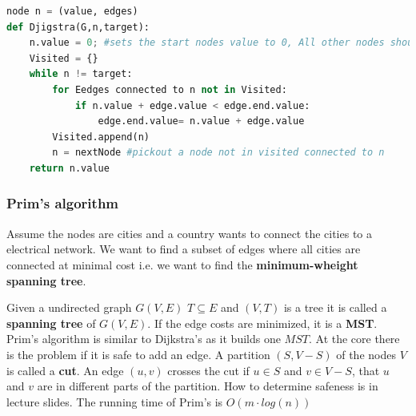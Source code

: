 \documentclass[12pt]{article} %
\begin{document}
\begin{lstlisting}[language=Python, caption=Dijkstra's in pseudo/Python]
node n = (value, edges)
def Djigstra(G,n,target):
    n.value = 0; #sets the start nodes value to 0, All other nodes should have inf as value. 
    Visited = {}
    while n != target:
        for Eedges connected to n not in Visited:
            if n.value + edge.value < edge.end.value:
                edge.end.value= n.value + edge.value
        Visited.append(n)
        n = nextNode #pickout a node not in visited connected to n
    return n.value
\end{lstlisting}

\subsubsection{Prim's algorithm}
Assume the nodes are cities and a country wants to connect the cities to a electrical network. We want to find a subset of edges where all cities are connected at minimal cost i.e. we want to find the \textbf{minimum-wheight spanning tree}.
\par Given a undirected graph $G(V,E)$ $T \subseteq E$ and $(V, T)$ is a tree it is called a \textbf{spanning tree} of $G(V, E)$. If the edge costs are minimized, it is a \textbf{MST}. Prim's algorithm is similar to Dijkstra's as it builds one $MST$. At the core there is the problem if it is safe to add an edge. A partition $(S, V - S)$ of the nodes $V$ is called a \textbf{cut}. An edge $(u, v)$ crosses the cut if $u \in S$ and $v \in V - S$, that $u$ and $v$ are in different parts of the partition. How to determine safeness is in lecture slides. The running time of Prim's is $O(m \cdot log(n))$
\end{document}
